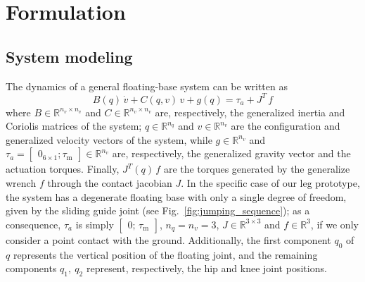 \section{Formulation}\label{sec:formulation}
\subsection{System modeling}
The dynamics of a general floating-base system can be written as
\begin{equation}\label{eq:rigid_body_dyn}
B(q)\,\dot{v} +C(q, v)\,v + g(q) = \tau_{a} + J^T\,f
\end{equation}
where $B\in\mathbb{R}^{n_v\times n_v}$ and $C\in\mathbb{R}^{n_v\times n_v}$ are, respectively, the generalized inertia and Coriolis matrices of the system; $q\in\mathbb{R}^{n_q}$ and $v\in\mathbb{R}^{n_v}$ are the configuration and generalized velocity vectors of the system, while $g\in\mathbb{R}^{n_v}$ and $\tau_a=\begin{bmatrix}
0_{6\times 1};
\tau_{\mathrm{m}}
\end{bmatrix}\in\mathbb{R}^{n_v}$ are, respectively, the generalized gravity vector and the actuation torques. Finally, $J^T(q)\,f$ are the torques generated by the generalize wrench $f$ through the contact jacobian $J$. In the specific case of our leg prototype, the system has a degenerate floating base with only a single degree of freedom, given by the sliding guide joint (see Fig.~\ref{fig:jumping_sequence}); as a consequence, $\tau_a$ is simply $\begin{bmatrix}
0;\,\tau_{\mathrm{m}}\end{bmatrix}$, $n_q = n_v = 3$, $J\in\mathbb{R}^{3\times 3}$ and $f\in\mathbb{R}^3$, if we only consider a point contact with the ground. Additionally, the first component $q_{0}$ of $q$ represents the vertical position of the floating joint, and the remaining components $q_1,~q_2$ represent, respectively, the hip and knee joint positions.
